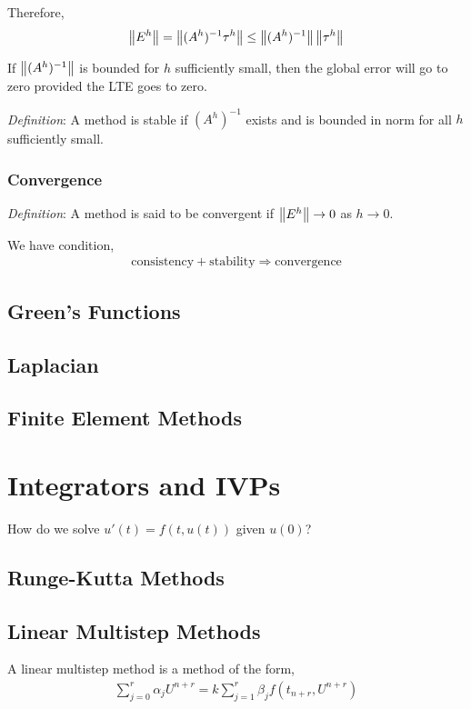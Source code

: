 \documentclass[12pt]{article}
\begin{document}
Therefore, 
\begin{align*}
    \left\lVert E^h\right\rVert = \left\lVert(A^h)^{-1} \tau^h\right\rVert \leq \left\lVert(A^h)^{-1}\right\rVert\left\lVert\tau^h\right\rVert
\end{align*}

If \( \left\lVert(A^h)^{-1}\right\rVert \) is bounded for \( h \) sufficiently small, then the global error will go to zero provided the LTE goes to zero.

\textit{Definition}: A method is stable if \( (A^h)^{-1} \) exists and is bounded in norm for all \( h \) sufficiently small.

\subsubsection{Convergence}
\textit{Definition}: A method is said to be convergent if \( \left\lVert E^h\right\rVert \to 0 \) as \( h\to 0 \).

We have condition,
\begin{align*}
    \text{consistency} + \text{stability} \Longrightarrow \text{convergence}
\end{align*}


\subsection{Green's Functions}

\subsection{Laplacian}

\subsection{Finite Element Methods}

\pagebreak
\section{Integrators and IVPs}
How do we solve \( u'(t) = f(t,u(t)) \) given \( u(0) \)?

\subsection{Runge-Kutta Methods}


\subsection{Linear Multistep Methods}
A linear multistep method is a method of the form,
\begin{align*}
    \sum_{j=0}^{r} \alpha_j U^{n+r} = k \sum_{j=1}^{r} \beta_j f(t_{n+r},U^{n+r})
\end{align*}
\end{document}
